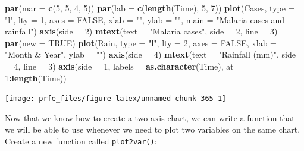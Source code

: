 \documentclass[12pt,a4paper]{book}
\newenvironment{Shaded}{\begin{snugshade}}{\end{snugshade}}
\newcommand{\DataTypeTok}[1]{\textcolor[rgb]{0.13,0.29,0.53}{#1}}
\newcommand{\DecValTok}[1]{\textcolor[rgb]{0.00,0.00,0.81}{#1}}
\newcommand{\KeywordTok}[1]{\textcolor[rgb]{0.13,0.29,0.53}{\textbf{#1}}}
\newcommand{\NormalTok}[1]{#1}
\newcommand{\OperatorTok}[1]{\textcolor[rgb]{0.81,0.36,0.00}{\textbf{#1}}}
\newcommand{\OtherTok}[1]{\textcolor[rgb]{0.56,0.35,0.01}{#1}}
\newcommand{\StringTok}[1]{\textcolor[rgb]{0.31,0.60,0.02}{#1}}
\theoremstyle{definition}
\theoremstyle{definition}
\theoremstyle{definition}
\theoremstyle{remark}
\begin{document}
\begin{Shaded}
\begin{Highlighting}[]
\KeywordTok{par}\NormalTok{(}\DataTypeTok{mar =} \KeywordTok{c}\NormalTok{(}\DecValTok{5}\NormalTok{, }\DecValTok{5}\NormalTok{, }\DecValTok{4}\NormalTok{, }\DecValTok{5}\NormalTok{))}
\KeywordTok{par}\NormalTok{(}\DataTypeTok{lab =} \KeywordTok{c}\NormalTok{(}\KeywordTok{length}\NormalTok{(Time), }\DecValTok{5}\NormalTok{, }\DecValTok{7}\NormalTok{))}
\KeywordTok{plot}\NormalTok{(Cases, }\DataTypeTok{type =} \StringTok{"l"}\NormalTok{, }\DataTypeTok{lty =} \DecValTok{1}\NormalTok{, }\DataTypeTok{axes =} \OtherTok{FALSE}\NormalTok{,}
     \DataTypeTok{xlab =} \StringTok{""}\NormalTok{, }\DataTypeTok{ylab =} \StringTok{""}\NormalTok{, }\DataTypeTok{main =} \StringTok{"Malaria cases and rainfall"}\NormalTok{)}
\KeywordTok{axis}\NormalTok{(}\DataTypeTok{side =} \DecValTok{2}\NormalTok{)}
\KeywordTok{mtext}\NormalTok{(}\DataTypeTok{text =} \StringTok{"Malaria cases"}\NormalTok{, }\DataTypeTok{side =} \DecValTok{2}\NormalTok{, }\DataTypeTok{line =} \DecValTok{3}\NormalTok{)}
\KeywordTok{par}\NormalTok{(}\DataTypeTok{new =} \OtherTok{TRUE}\NormalTok{)}
\KeywordTok{plot}\NormalTok{(Rain, }\DataTypeTok{type =} \StringTok{"l"}\NormalTok{, }\DataTypeTok{lty =} \DecValTok{2}\NormalTok{, }\DataTypeTok{axes =} \OtherTok{FALSE}\NormalTok{,}
     \DataTypeTok{xlab =} \StringTok{"Month & Year"}\NormalTok{, }\DataTypeTok{ylab =} \StringTok{""}\NormalTok{)}
\KeywordTok{axis}\NormalTok{(}\DataTypeTok{side =} \DecValTok{4}\NormalTok{)}
\KeywordTok{mtext}\NormalTok{(}\DataTypeTok{text =} \StringTok{"Rainfall (mm)"}\NormalTok{, }\DataTypeTok{side =} \DecValTok{4}\NormalTok{, }\DataTypeTok{line =} \DecValTok{3}\NormalTok{)}
\KeywordTok{axis}\NormalTok{(}\DataTypeTok{side =} \DecValTok{1}\NormalTok{, }\DataTypeTok{labels =} \KeywordTok{as.character}\NormalTok{(Time), }\DataTypeTok{at =} \DecValTok{1}\OperatorTok{:}\KeywordTok{length}\NormalTok{(Time))}
\end{Highlighting}
\end{Shaded}

\begin{center}\texttt{[image: prfe\_files/figure-latex/unnamed-chunk-365-1]} \end{center}

\newpage

Now that we know how to create a two-axis chart, we can write a function
that we will be able to use whenever we need to plot two variables on
the same chart. Create a new function called \texttt{plot2var()}:
\end{document}
